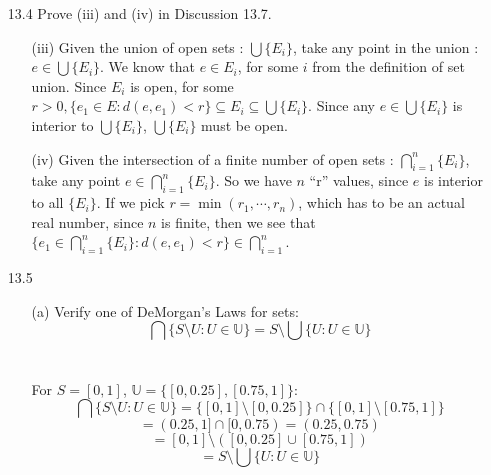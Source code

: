 
\usepackage{amsmath, dsfont}

\oddsidemargin 0in
\evensidemargin 0in
\textwidth 6.5in
\topmargin -0.5in
\textheight 9.0in
\newcommand{\norm}[1]{\left\lVert #1 \right\rVert}
\newcommand{\abs}[1]{\left\vert #1 \right\vert}
\newcommand{\?}{\stackrel{?}{=}}



\pagestyle{myheadings}

\begin{itemize}
  \item [13.4]
    Prove (iii) and (iv) in Discussion 13.7.
    \begin{itemize}
      \item [(iii)]
        Given the union of open sets : $\bigcup \{E_i\}$, take any point in the union : $e \in \bigcup \{E_i\}$. We know that $e \in E_i$, for some $i$ from the definition of set union. Since $E_i$ is open, for some $r > 0, \{ e_1 \in E : d(e,e_1) < r \} \subseteq E_i \subseteq \bigcup \{E_i\}$. Since any $e \in \bigcup \{E_i\}$ is interior to $\bigcup \{E_i\}$, $\bigcup \{E_i\}$ must be open.\\

      \item[(iv)]
        Given the intersection of a finite number of open sets : $\bigcap_{i=1}^n \{E_i\}$, take any point $e \in \bigcap_{i=1}^n \{E_i\}$. So we have $n$ ``r'' values, since $e$ is interior to all $\{E_i\}$. If we pick $r = \min(r_1,\cdots,r_n)$, which has to be an actual real number, since $n$ is finite, then we see that $\{e_1 \in \bigcap_{i=1}^n \{E_i\} : d(e,e_1) < r \} \in \bigcap_{i=1}^n$.\\
    \end{itemize}
  \item [13.5]
    \begin{enumerate}
      \item [(a)] Verify one of DeMorgan's Laws for sets:
        $$\bigcap \{S \setminus U : U \in \mathds{U} \} = S \setminus \bigcup \{U : U \in \mathds{U} \}$$\\\\

        For $S = [0,1]$, $\mathds{U} = \{[0,0.25], [0.75, 1]\}$:
        $$\bigcap \{S \setminus U : U \in \mathds{U} \} = \{[0,1] \setminus [0,0.25]\} \cap \{[0,1] \setminus [0.75,1]\}$$
        $$= (0.25, 1] \cap [0, 0.75) = (0.25, 0.75) $$
        $$= [0,1] \setminus ([0,0.25] \cup [0.75,1])$$
        $$= S \setminus \bigcup \{U : U \in \mathds{U} \}$$\\


\end{enumerate}
\end{itemize}
